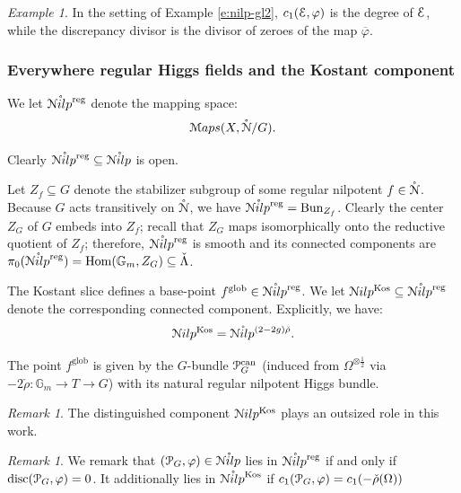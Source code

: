 \documentclass[reqno,11pt]{amsart}
\numberwithin{equation}{subsection}
\theoremstyle{remark}
\newtheorem{rem}[thm]{Remark}
\newtheorem{example}[thm]{Example}
\newcommand{\bG}{{\mathbb G}}
\newcommand{\sE}{{\EuScript E}}
\newcommand{\sM}{{\EuScript M}}
\newcommand{\sN}{{\EuScript N}}
\newcommand{\sP}{{\EuScript P}}
\newcommand{\on}{\operatorname}
\newcommand{\ol}[1]{\overline{#1}{}}
\newcommand{\Hom}{\on{Hom}}
\newcommand{\vph}{\varphi}
\newcommand{\Bun}{\on{Bun}}
\newcommand{\Maps}{\sM aps}
\renewcommand{\o}[1]{\mathring{#1}}
\renewcommand{\subset}{\subseteq}
\newcommand{\Nilp}{\sN ilp}
\newcommand{\Kos}{\on{Kos}}
\begin{document}
\begin{example}

In the setting of Example \ref{e:nilp-gl2}, $c_1(\sE,\vph)$ is the degree
of $\sE$, while the discrepancy divisor is the divisor of zeroes of 
the map $\ol{\vph}$.

\end{example}


\subsubsection{Everywhere regular Higgs fields and the Kostant component}\label{sss:kost-defin}

We let $\o{\Nilp}^{\on{reg}}$ denote the mapping space:
%
\[
\Maps(X,\o{\sN}/G).
\]

\noindent Clearly $\o{\Nilp}^{\on{reg}} \subset \o{\Nilp}$ is open.

Let $Z_f \subset G$ denote the stabilizer subgroup of 
some regular nilpotent $f \in \o{\sN}$. Because $G$ acts
transitively on $\o{\sN}$, we have 
$\o{\Nilp}^{\on{reg}} = \Bun_{Z_f}$. Clearly the center
$Z_G$ of $G$ embeds into $Z_f$; recall that $Z_G$ maps isomorphically 
onto the reductive quotient of $Z_f$; therefore, $\o{\Nilp}^{\on{reg}}$
is smooth and its connected components are 
$\pi_0(\o{\Nilp}^{\on{reg}}) = \Hom(\bG_m,Z_G) \subset \check{\Lambda}$.

The Kostant slice defines a base-point $f^{\on{glob}} \in \o{\Nilp}^{\on{reg}}$.
We let $\Nilp^{\Kos} \subset \o{\Nilp}^{\on{reg}}$ denote the corresponding
connected component. Explicitly, we have:
%
\[
\Nilp^{\Kos} = \o{\Nilp}^{(2-2g)\check{\rho}}.
\]

The point $f^{\on{glob}}$ is given by the $G$-bundle $\sP_G^{\on{can}}$
(induced from $\Omega^{\otimes\frac{1}{2}}$ via $-2\check{\rho}:\bG_m \to T \to G$)
with its natural regular nilpotent Higgs bundle.

\begin{rem}

The distinguished component $\Nilp^{\Kos}$ plays an outsized role in this work.

\end{rem}

\begin{rem}

We remark that $(\sP_G,\vph) \in \o{\Nilp}$ lies in 
$\o{\Nilp}^{\on{reg}}$ if and only if $\on{disc}(\sP_G,\vph) = 0$.
It additionally lies in $\o{\Nilp}^{\Kos}$ if 
$c_1(\sP_G,\vph) = c_1(-\check{\rho}(\Omega))$

\end{rem}
\end{document}
